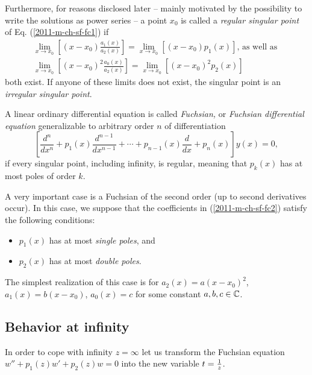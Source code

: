 Furthermore, for reasons disclosed later
-- mainly motivated by the possibility to write the solutions as power series --
a point $x_0$ is called a
{\em regular singular point}
of Eq. (\ref{2011-m-ch-sf-fc1})
if
\begin{equation}
\begin{split}
\lim_{x\rightarrow x_0} \left[ (x-x_0)\frac{ a_1(x)}{a_2(x)} \right]
=
\lim_{x\rightarrow x_0} \left[ (x-x_0) p_1(x) \right]
\textrm{, as well as }\\
\lim_{x\rightarrow x_0} \left[ (x-x_0)^2 \frac{a_0(x)}{a_2(x)} \right]
=
\lim_{x\rightarrow x_0} \left[ (x-x_0)^2 p_2(x) \right]
\end{split}
\end{equation}
both exist.
If anyone of these limits does not exist, the singular point is
an
{\em irregular singular point}.

A linear ordinary differential equation is called {\em Fuchsian,}
or {\em Fuchsian differential equation}
generalizable to arbitrary order $n$ of differentiation
\begin{equation}
\left[ \frac{d^n}{dx^n} + p_1  (x) \frac{d^{n-1}}{dx^{n-1}} + \cdots  + p_{n-1}  (x)  \frac{d}{dx}+    p_n  (x) \right]
y(x)
 =
0,
\label{2011-m-ch-sf-fc2gc}
\end{equation}
if every singular point, including infinity,
is regular, meaning that  $p_k (x)$ has at most poles of order $k$.


A  very important case is a Fuchsian of the second order
(up to second derivatives occur).
In this case,
we suppose that the coefficients in (\ref{2011-m-ch-sf-fc2})
satisfy the following conditions:
\begin{itemize}
\item
$p_1  (x)$ has at most {\em single poles}, and
\item
$p_2 (x)$ has at most  {\em double poles}.
\end{itemize}

The simplest realization of this case is for
$
a_2(x)= a(x-x_0)^2
$,
$
a_1(x)= b(x-x_0)
$,
$
a_0(x)= c
$
for some constant $a,b,c \in {\Bbb C}$.


\subsection{Behavior at infinity}
\label{2012-m-ch-feainfty}
In order to cope with infinity $z=\infty$
let us transform the Fuchsian equation $w'' +p_1(z)w' +p_2(z)w=0$
into the new variable $t={1\over z}$.

